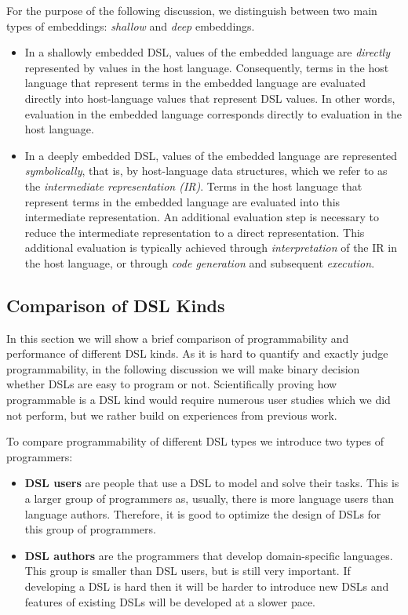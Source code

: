 For the purpose of the following discussion, we distinguish between two main types of embeddings: \emph{shallow} and
\emph{deep} embeddings.

  \begin{itemize}

  \item In a shallowly embedded DSL, values of the embedded language
    are \emph{directly} represented by values in the host language.
    Consequently, terms in the host language that represent terms in
    the embedded language are evaluated directly into host-language
    values that represent DSL values. In other words, evaluation in
    the embedded language corresponds directly to evaluation in the
    host language.

  \item In a deeply embedded DSL, values of the embedded language are
    represented \emph{symbolically}, that is, by host-language data
    structures, which we refer to as the \emph{intermediate
      representation (IR)}. Terms in the host language that represent
    terms in the embedded language are evaluated into this intermediate
    representation. An additional evaluation step is necessary to
    reduce the intermediate representation to a direct representation.
    This additional evaluation is typically achieved through
    \emph{interpretation} of the IR in the host language, or through
    \emph{code generation} and subsequent \emph{execution}.

  \end{itemize}


\subsection{Comparison of DSL Kinds}
\label{sec:comparison-of-dsl-kinds}
In this section we will show a brief comparison of programmability and performance
 of different DSL kinds. As it is hard to quantify and exactly judge programmability,
 in the following discussion we will make binary decision whether DSLs are easy to
 program or not. Scientifically proving how programmable is a DSL kind would require
 numerous user studies which we did not perform, but we rather build on experiences
 from previous work.

To compare programmability of different DSL types we introduce two types of programmers:\begin{itemize}
  \item {\bf DSL users} are people that use a DSL to model and solve their tasks. This is a larger group of
   programmers as, usually, there is more language users than language authors. Therefore, it is good
   to optimize the design of DSLs for this group of programmers.

  \item {\bf DSL authors} are the programmers that develop domain-specific languages. This
   group is smaller than DSL users, but is still very important. If developing a DSL is hard
   then it will be harder to introduce new DSLs and features of existing DSLs will be
   developed at a slower pace.
 \end{itemize}

